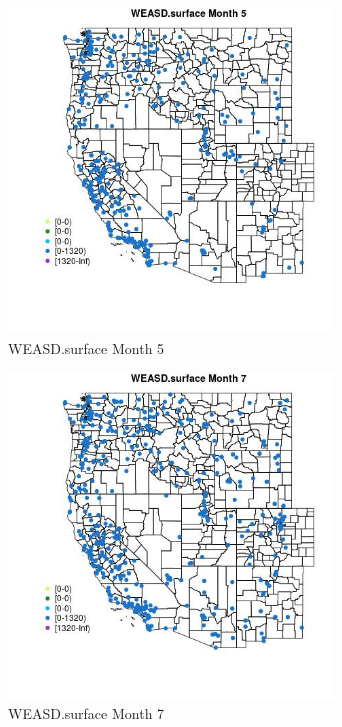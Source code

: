\begin{figure} 
\centering  
\includegraphics[width=0.77\textwidth]{Code_Outputs/Report_ML_input_PM25_Step4_part_e_de_duplicated_aves_compiled_2019-05-18wNAs_MapObsMo5WEASDsurface.jpg} 
\caption{\label{fig:Report_ML_input_PM25_Step4_part_e_de_duplicated_aves_compiled_2019-05-18wNAsMapObsMo5WEASDsurface}WEASD.surface Month 5} 
\end{figure} 
 

\begin{figure} 
\centering  
\includegraphics[width=0.77\textwidth]{Code_Outputs/Report_ML_input_PM25_Step4_part_e_de_duplicated_aves_compiled_2019-05-18wNAs_MapObsMo7WEASDsurface.jpg} 
\caption{\label{fig:Report_ML_input_PM25_Step4_part_e_de_duplicated_aves_compiled_2019-05-18wNAsMapObsMo7WEASDsurface}WEASD.surface Month 7} 
\end{figure} 
 


